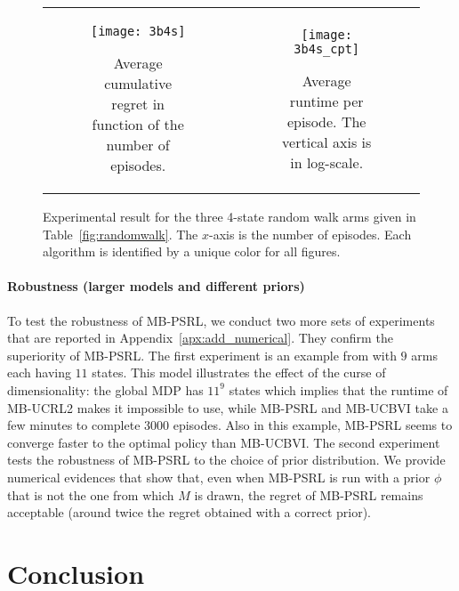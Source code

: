 \begin{figure}[ht]
    \begin{tabular}{cc}
        \begin{subfigure}[t]{0.47\linewidth}
            \texttt{[image: 3b4s]} 
            \caption{Average cumulative regret in function of the number of episodes.}
            \label{fig:randomwalk_3b4s}
        \end{subfigure}&
        \begin{subfigure}[t]{0.47\linewidth}
            \texttt{[image: 3b4s\_cpt]}
            \caption{Average runtime per episode. The vertical axis is in log-scale.}
            \label{fig:randomwalk_cpt_3b4s}
    \end{subfigure}
    \end{tabular}
    \caption{Experimental result for the three 4-state random walk arms given in Table~\ref{fig:randomwalk}. The $x$-axis is the number of episodes. Each algorithm is identified by a unique color for all figures.}
\end{figure}

\paragraph{Robustness (larger models and different priors)}
To test the robustness of MB-PSRL, we conduct two more sets of experiments that are reported in Appendix~\ref{apx:add_numerical}. They confirm the superiority of MB-PSRL.
The first experiment is an example from \cite{duff1995q} with $9$ arms each having $11$ states. This model illustrates the effect of the curse of dimensionality: the global  MDP has $11^9$ states which implies that the runtime of MB-UCRL2 makes it impossible to use, while MB-PSRL and MB-UCBVI take a few minutes to complete 3000 episodes.  Also in this example, MB-PSRL seems to converge faster to the optimal policy than MB-UCBVI. The second experiment tests the robustness of MB-PSRL to the choice of prior distribution. We provide numerical evidences that show that, even when MB-PSRL is run with a prior $\phi$ that is not the one from which $M$ is drawn, the regret of MB-PSRL remains acceptable (around twice the regret obtained with a correct prior). 


\section{Conclusion}
\label{sec:conclusion}

